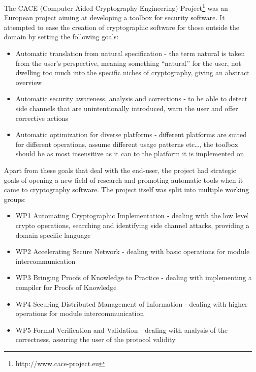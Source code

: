 The CACE (Computer Aided Cryptography Engineering)
Project\footnote{http://www.cace-project.eu} was an European project
aiming at developing a toolbox for security software. It attempted to
ease the creation of cryptographic software for those outside the
domain by setting the following goals:
\begin{itemize}
\item Automatic translation from natural specification - the
  term natural is taken from the user's perspective, meaning something
  ``natural'' for the user, not dwelling too much into the specific
  niches of cryptography, giving an abstract overview
\item Automatic security awareness, analysis and corrections - to be
  able to detect side channels that are unintentionally introduced,
  warn the user and offer corrective actions
\item Automatic optimization for diverse platforms - different
  platforms are suited for different operations, assume different
  usage patterns etc\ldots, the toolbox should be as most insensitive
  as it can to the platform it is implemented on
\end{itemize}

Apart from these goals that deal with the end-user, the project had
strategic goals of opening a new field of research and promoting
automatic tools when it came to cryptography software. The project
itself was split into multiple working groups:
\begin{itemize}
\item WP1 Automating Cryptographic Implementation - dealing with the
  low level crypto operations, searching and identifying side channel
  attacks, providing a domain specific language
\item WP2 Accelerating Secure Network - dealing with basic operations
  for module intercommunication
\item WP3 Bringing Proofs of Knowledge to Practice - dealing with
  implementing a compiler for Proofs of Knowledge
\item WP4 Securing Distributed Management of Information - dealing
  with higher operations for module intercommunication
\item WP5 Formal Verification and Validation - dealing with analysis
  of the correctness, assuring the user of the protocol validity
\end{itemize}

